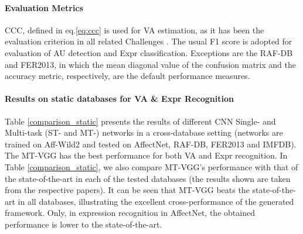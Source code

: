 \documentclass{bmvc2k}
\begin{document}
\begin{table}[h]
\caption{Properties of Databases used in our Experiments} 
\label{databases}
\centering
{}
\end{table}

\paragraph{Evaluation Metrics}
CCC, defined in eq.\ref{eq:ccc} is used for VA estimation, as it has been the evaluation criterion in all related Challenges \cite{kollias2019deep,ringeval2017avec}. The usual F1 score is adopted for evaluation of AU detection and Expr classification. Exceptions are the RAF-DB and FER2013, in which the mean diagonal value of the confusion matrix and the accuracy metric, respectively, are the default performance measures.

\paragraph{Results on static databases for VA \& Expr Recognition}
Table \ref{comparison_static} presents the results of different CNN Single- and Multi-task (ST- and MT-) networks in a cross-database setting (networks are trained on Aff-Wild2 and tested on AffectNet, RAF-DB, FER2013 and IMFDB). The MT-VGG has the best performance for both VA and Expr recognition. In Table \ref{comparison_static}, we also compare MT-VGG's performance with that of the state-of-the-art in each of the tested databases (the results shown are taken from the respective papers). It can be seen that MT-VGG beats the state-of-the-art in all databases, illustrating the excellent cross-performance of the generated framework.  Only, in expression recognition in AffectNet, the obtained performance is lower to the state-of-the-art. 
\end{document}
